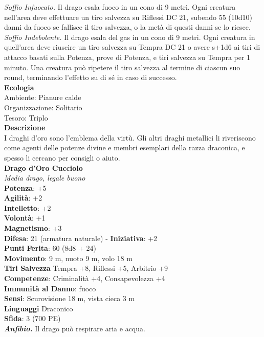 \begin{multicols}{2}
\emph{Soffio Infuocato.} Il drago esala fuoco in un cono di 9 metri. Ogni creatura nell'area deve effettuare un tiro salvezza su Riflessi DC  21, subendo 55 (10d10) danni da fuoco se fallisce il tiro salvezza, o la metà di questi danni se lo riesce.\\
\emph{Soffio Indebolente.} Il drago esala del gas in un cono di 9 metri. Ogni creatura in quell'area deve riuscire un tiro salvezza su Tempra DC  21 o avere s+1d6 ai tiri di attacco basati sulla Potenza, prove di Potenza, e tiri salvezza su Tempra per 1 minuto. Una creatura può ripetere il tiro salvezza al termine di ciascun suo round, terminando l'effetto su di sé in caso di successo.\\
\textbf{Ecologia}\\
Ambiente: Pianure calde\\
Organizzazione: Solitario\\
Tesoro: Triplo\\
\textbf{Descrizione}\\
I draghi d'oro sono l'emblema della virtù. Gli altri draghi metallici li riveriscono come agenti delle potenze divine e membri esemplari della razza draconica, e spesso li cercano per consigli o aiuto.\\
\medskip\textbf{Drago d'Oro Cucciolo}\\
\emph{Media drago, legale buono}\\
\textbf{Potenza}: +5\\
\textbf{Agilità}: +2\\
\textbf{Intelletto}: +2\\
\textbf{Volontà}: +1\\
\textbf{Magnetismo}: +3\\
\textbf{Difesa}: 21 (armatura naturale) - \textbf{Iniziativa}: +2\\
\textbf{Punti Ferita}: 60 (8d8 + 24)\\
\textbf{Movimento}: 9 m, nuoto 9 m, volo 18 m\\
\textbf{Tiri Salvezza} Tempra +8, Riflessi +5, Arbitrio +9\\
\textbf{Competenze}: Criminalità +4, Consapevolezza +4\\
\textbf{Immunità al Danno}: fuoco\\
\textbf{Sensi}: Scurovisione 18 m, vista cieca 3 m \\
\textbf{Linguaggi} Draconico\\
\textbf{Sfida}: 3 (700 PE)\smallskip\\
\emph{\textbf{Anfibio.}} Il drago può respirare aria e acqua.\\

\end{multicols}
